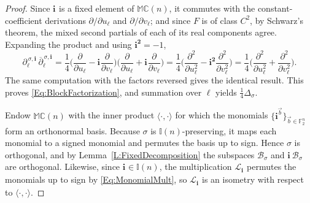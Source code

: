 \documentclass[12pt]{amsart}
\theoremstyle{plain}
\theoremstyle{definition}
\numberwithin{equation}{section}
\newcommand{\im}[1]{\mathbf{ i_{#1}}}
\newcommand{\ims}[1]{\mathbf{ i_{#1}^2}}
\newcommand{\mC}{\mathbb{C}}
\newcommand{\mM}{\mathbb{M}}
\newcommand{\mI}{\mathbb{I}}
\newcommand{\cL}{\mathcal{L}}
\newcommand{\cB}{\mathcal{B}}
\begin{document}
    \begin{proof}
    Since $\im{}$ is a fixed element of $\mM \mC(n)$, it commutes with the constant-coefficient derivations $\partial / \partial u_\ell$ and $\partial / \partial v_\ell$; and since $F$ is of class $C^2$, by Schwarz's theorem, the mixed second partials of each of its real components agree. Expanding the product and using $\ims{} = -1$,
    \[
    \partial_\ell^{\, \sigma , \im{}}\, \overline{\partial}_\ell^{\, \sigma , \im{}} = \frac{1}{4} \Big( \frac{\partial}{\partial u_\ell} - \im{} \frac{\partial}{\partial v_\ell} \Big) \Big( \frac{\partial}{\partial u_\ell} + \im{} \frac{\partial}{\partial v_\ell} \Big) = \frac{1}{4} \Big( \frac{\partial^2}{\partial u_\ell^2} - \ims{} \frac{\partial^2}{\partial v_\ell^2} \Big) = \frac{1}{4} \Big( \frac{\partial^2}{\partial u_\ell^2} + \frac{\partial^2}{\partial v_\ell^2} \Big) .
    \]
    The same computation with the factors reversed gives the identical result. This proves \eqref{Eq:BlockFactorization}, and summation over $\ell$ yields $\tfrac{1}{4} \Delta_\sigma$.

    Endow $\mM \mC(n)$ with the inner product $\langle \cdot , \cdot \rangle$ for which the monomials $\{ \mathbf i^{\vec b} \}_{\vec b \in \mathbb F_2^n}$ form an orthonormal basis. Because $\sigma$ is $\mI(n)$-preserving, it maps each monomial to a signed monomial and permutes the basis up to sign. Hence $\sigma$ is orthogonal, and by Lemma~\ref{L:FixedDecomposition} the subspaces $\cB_\sigma$ and $\im{}\, \cB_\sigma$ are orthogonal. Likewise, since $\im{} \in \mI(n)$, the multiplication $\cL_{\im{}}$ permutes the monomials up to sign by \eqref{Eq:MonomialMult}, so $\cL_{\im{}}$ is an isometry with respect to $\langle \cdot , \cdot \rangle$. 


\end{proof}
\end{document}
